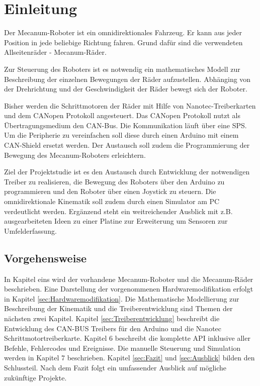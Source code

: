 
\section{Einleitung}

Der Mecanum-Roboter ist ein omnidirektionales Fahrzeug. Er kann aus jeder Position in jede beliebige Richtung fahren. Grund dafür sind die verwendeten Allseitenräder - Mecanum-Räder. 

Zur Steuerung des Roboters ist es notwendig ein mathematisches Modell zur Beschreibung der einzelnen Bewegungen der Räder aufzustellen. Abhänging von der Drehrichtung und der Geschwindigkeit der Räder bewegt sich der Roboter.

Bisher werden die Schrittmotoren der Räder mit Hilfe von Nanotec-Treiberkarten und dem CANopen Protokoll angesteuert. Das CANopen Protokoll nutzt als Übertragungsmedium den CAN-Bus. Die Kommunikation läuft über eine SPS. Um die Peripherie zu vereinfachen soll diese durch einen Arduino mit einem CAN-Shield ersetzt werden. Der Austausch soll zudem die Programmierung der Bewegung des Mecanum-Roboters erleichtern.

Ziel der Projektstudie ist es den Austausch durch Entwicklung der notwendigen Treiber zu realisieren, die Bewegung des Roboters über den Arduino zu programmieren und den Roboter über einen Joystick zu steuern. Die omnidirektionale Kinematik soll zudem durch einen Simulator am PC verdeutlicht werden. Ergänzend steht ein weitreichender Ausblick mit z.B.  ausgearbeiteten Ideen zu einer Platine zur Erweiterung um Sensoren zur Umfelderfassung. 

\subsection*{Vorgehensweise}
In Kapitel eins wird der vorhandene Mecanum-Roboter und die Mecanum-Räder beschrieben. Eine Darstellung der vorgenommenen Hardwaremodifikation erfolgt in Kapitel \ref{sec:Hardwaremodifikation}. 
Die Mathematische Modellierung zur Beschreibung der Kinematik und die Treiberentwicklung sind Themen der nächsten zwei Kapitel. Kapitel \ref{sec:Treiberentwicklung} beschreibt die Entwicklung des CAN-BUS Treibers für den Arduino und die Nanotec Schrittmotortreiberkarte. Kapitel 6 beschreibt die komplette API inklusive aller Befehle, Fehlercodes und Ereignisse. Die manuelle Steuerung und Simulation werden in Kapitel 7 beschrieben.
Kapitel \ref{sec:Fazit} und \ref{sec:Ausblick} bilden den Schlussteil. Nach dem Fazit folgt ein umfassender Ausblick auf mögliche zukünftige Projekte.

